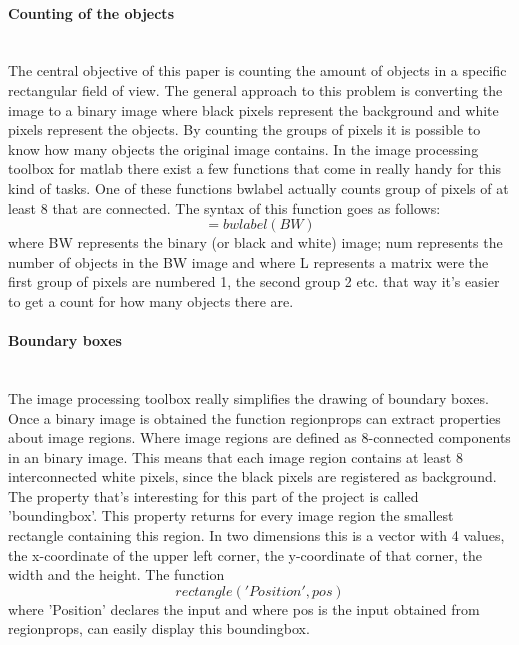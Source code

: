 \documentclass[11pt]{article}
\begin{document}
\paragraph{Counting of the objects}\mbox{}\\
The central objective of this paper is counting the amount of objects in a specific rectangular field of view. The general approach to this problem is converting the image to a binary image where black pixels represent the background and white pixels represent the objects. By counting the groups of pixels it is possible to know how many objects the original image contains. In the image processing toolbox for matlab there exist a few functions that come in really handy for this kind of tasks. One of these functions bwlabel actually counts group of pixels of at least 8 that are connected. The syntax of this function goes as follows: 
\begin{equation}
[L, num] = bwlabel(BW)
\end{equation}
where BW represents the binary (or black and white) image; num represents the number of objects in the BW image and where L represents a matrix were the first group of pixels are numbered 1, the second group 2 etc. that way it's easier to get a count for how many objects there are.

\paragraph{Boundary boxes}\mbox{}\\
The image processing toolbox really simplifies the drawing of boundary boxes. Once a binary image is obtained the function regionprops can extract properties about image regions. Where image regions are defined as 8-connected components in an binary image. This means that each image region contains at least 8 interconnected white pixels, since the black pixels are registered as background. The property that's interesting for this part of the project is called 'boundingbox'. This property returns for every image region the smallest rectangle containing this region. In two dimensions this is a vector with 4 values, the x-coordinate of the upper left corner, the y-coordinate of that corner, the width and the height. The function 
\begin{equation}
rectangle('Position', pos)
\end{equation}
where 'Position' declares the input and where pos is the input obtained from regionprops, can easily display this boundingbox. 
\end{document}
